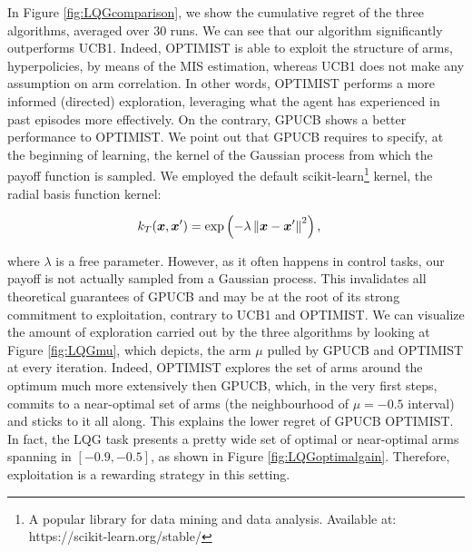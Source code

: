 In Figure \ref{fig:LQGcomparison}, we show the cumulative regret of the three algorithms, averaged over 30 runs. We can see that our algorithm significantly outperforms \gls{UCB}1.
Indeed, \gls{OPTIMIST} is able to exploit the structure of arms, \ie hyperpolicies, by means of the \gls{MIS} estimation, whereas \gls{UCB}1 does not make any assumption on arm correlation. In other words, \gls{OPTIMIST} performs a more informed (directed) exploration, leveraging what the agent has experienced in past episodes more effectively. On the contrary, \gls{GPUCB} shows a better performance \wrt to \gls{OPTIMIST}. We point out that \gls{GPUCB} requires to specify, at the beginning of learning, the kernel of the Gaussian process from which the payoff function is sampled. We employed the default scikit-learn\footnote{A popular library for data mining and data analysis. Available at: https://scikit-learn.org/stable/} kernel, \ie the radial basis function kernel:

\begin{align}
	k_T(\boldsymbol{x},\boldsymbol{x}') &= \exp\left(-\lambda\left\|\boldsymbol{x}-\boldsymbol{x}'\right\|_{}^2\right),
\end{align}

where $\lambda$ is a free parameter. However, as it often happens in control tasks, our payoff is not actually sampled from a Gaussian process. This invalidates all theoretical guarantees of \gls{GPUCB} and may be at the root of its strong commitment to exploitation, contrary to \gls{UCB}1 and \gls{OPTIMIST}. We can visualize the amount of exploration carried out by the three algorithms by looking at Figure \ref{fig:LQGmu}, which depicts, the arm $\mu$ pulled by \gls{GPUCB} and \gls{OPTIMIST} at every iteration. Indeed, \gls{OPTIMIST} explores the set of arms around the optimum much more extensively then \gls{GPUCB}, which, in the very first steps, commits to a near-optimal set of arms (the neighbourhood of $\mu=-0.5$ interval) and sticks to it all along. This explains the lower regret of \gls{GPUCB} \wrt \gls{OPTIMIST}. In fact, the \gls{LQG} task presents a pretty wide set of optimal or near-optimal arms spanning in $[-0.9,-0.5]$, as shown in Figure \ref{fig:LQGoptimalgain}. Therefore, exploitation is a rewarding strategy in this setting.


